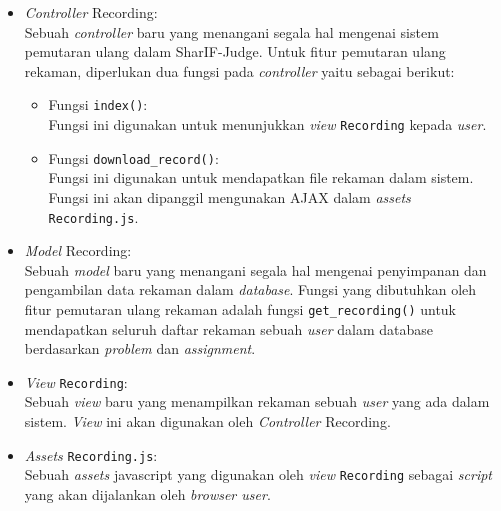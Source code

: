 \begin{itemize}
    \item \textit{Controller} Recording: \\
    Sebuah \textit{controller} baru yang menangani segala hal mengenai sistem pemutaran ulang dalam SharIF-Judge. Untuk fitur pemutaran ulang rekaman, diperlukan dua fungsi pada \textit{controller} yaitu sebagai berikut:
    \begin{itemize}
        \item Fungsi \verb|index()|: \\
        Fungsi ini digunakan untuk menunjukkan \textit{view} \verb|Recording| kepada \textit{user}.
        \item Fungsi \verb|download_record()|: \\
        Fungsi ini digunakan untuk mendapatkan file rekaman dalam sistem. Fungsi ini akan dipanggil mengunakan AJAX dalam \textit{assets} \verb|Recording.js|.
    \end{itemize} 
    \item \textit{Model} Recording: \\
    Sebuah \textit{model} baru yang menangani segala hal mengenai penyimpanan dan pengambilan data rekaman dalam \textit{database}. Fungsi yang dibutuhkan oleh fitur pemutaran ulang rekaman adalah fungsi \verb|get_recording()| untuk mendapatkan seluruh daftar rekaman sebuah \textit{user} dalam database berdasarkan \textit{problem} dan \textit{assignment}.
    \item \textit{View} \verb|Recording|: \\
    Sebuah \textit{view} baru yang menampilkan rekaman sebuah \textit{user} yang ada dalam sistem. \textit{View} ini akan digunakan oleh \textit{Controller} Recording.
    \item \textit{Assets} \verb|Recording.js|: \\
    Sebuah \textit{assets} javascript yang digunakan oleh \textit{view} \verb|Recording| sebagai \textit{script} yang akan dijalankan oleh \textit{browser user}.
\end{itemize}